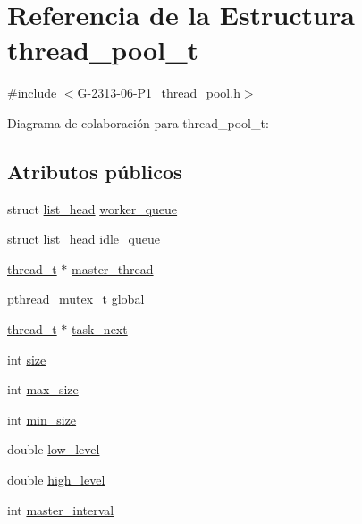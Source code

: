 \hypertarget{structthread__pool__t}{}\section{Referencia de la Estructura thread\+\_\+pool\+\_\+t}
\label{structthread__pool__t}


{\ttfamily \#include $<$G-\/2313-\/06-\/\+P1\+\_\+thread\+\_\+pool.\+h$>$}



Diagrama de colaboración para thread\+\_\+pool\+\_\+t\+:
\subsection*{Atributos públicos}
\begin{DoxyCompactItemize}
\item 
struct \hyperlink{structlist__head}{list\+\_\+head} \hyperlink{structthread__pool__t_a44640e57780a54d437d7589b1c754ac1}{worker\+\_\+queue}
\item 
struct \hyperlink{structlist__head}{list\+\_\+head} \hyperlink{structthread__pool__t_a38a9fa0d0ea1060d5bbff8421a92c1c7}{idle\+\_\+queue}
\item 
\hyperlink{structthread__t}{thread\+\_\+t} $\ast$ \hyperlink{structthread__pool__t_a9ad8218717dde39eef701a8bce5ca0a1}{master\+\_\+thread}
\item 
pthread\+\_\+mutex\+\_\+t \hyperlink{structthread__pool__t_aaa6e0a9d9c28c3f9be7eccbe8003af23}{global}
\item 
\hyperlink{structthread__t}{thread\+\_\+t} $\ast$ \hyperlink{structthread__pool__t_a00ce5a27204f85e624552f7448ba7093}{task\+\_\+next}
\item 
int \hyperlink{structthread__pool__t_a3185c157636a142415699a20042d6dd8}{size}
\item 
int \hyperlink{structthread__pool__t_a978e7f94032dad6e7a373e7bc1896237}{max\+\_\+size}
\item 
int \hyperlink{structthread__pool__t_a80aa1805a11e2e6e2bf5811fda0ffc26}{min\+\_\+size}
\item 
double \hyperlink{structthread__pool__t_a815792ab9c936b06d46ef3e149e5fd88}{low\+\_\+level}
\item 
double \hyperlink{structthread__pool__t_aa771fc181f63c16346fff1c7eb0d9014}{high\+\_\+level}
\item 
int \hyperlink{structthread__pool__t_ae3eaf8d90ef550166e595286a6175d14}{master\+\_\+interval}
\end{DoxyCompactItemize}


